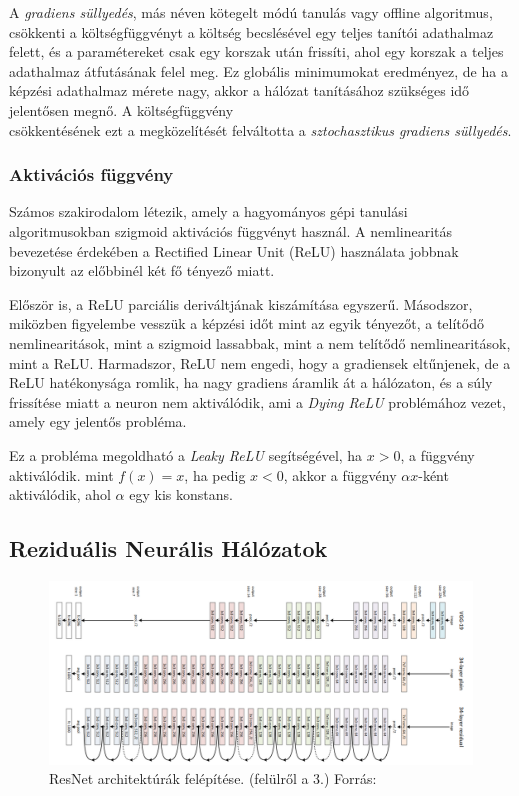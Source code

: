 \documentclass[12pt,a4]{article}
\begin{document}
	
	A \textit{gradiens süllyedés}, más néven kötegelt módú tanulás vagy offline algoritmus, csökkenti a költségfüggvényt a költség becslésével egy teljes tanítói adathalmaz felett, és a paramétereket csak egy korszak után frissíti, ahol egy korszak a teljes adathalmaz átfutásának felel meg.
	Ez globális minimumokat eredményez, de ha a képzési adathalmaz mérete nagy, akkor a hálózat tanításához szükséges idő
	jelentősen megnő. A költségfüggvény
	\\
	csökkentésének ezt a megközelítését felváltotta a \textit{sztochasztikus gradiens süllyedés}.
	\subsubsection{Aktivációs függvény}
	
	
	Számos szakirodalom létezik, amely a hagyományos gépi tanulási algoritmusokban
	szigmoid aktivációs függvényt használ.
	A nemlinearitás bevezetése érdekében a Rectified Linear Unit (ReLU) \cite{CNN} használata jobbnak bizonyult az előbbinél
	két fő tényező miatt. 
	
	Először is, a ReLU parciális deriváltjának kiszámítása egyszerű. 
	Másodszor, miközben figyelembe vesszük
	a képzési időt mint az egyik tényezőt, a telítődő nemlinearitások, mint a szigmoid lassabbak, mint a nem telítődő nemlinearitások, mint a ReLU.
	 Harmadszor, ReLU nem engedi, hogy a gradiensek eltűnjenek, de a ReLU hatékonysága romlik, ha nagy gradiens áramlik át a hálózaton, és a súly frissítése miatt a neuron nem aktiválódik, ami a \textit{Dying ReLU} problémához vezet, amely egy jelentős probléma. 
	 
	 Ez a probléma megoldható a \textit{Leaky ReLU} segítségével, ha $x>0$, a függvény aktiválódik.
	mint $f(x)= x$, ha pedig $x<0$, akkor a függvény $\alpha x$-ként aktiválódik, ahol $\alpha$ egy kis konstans.

    \subsection{Reziduális Neurális Hálózatok}
    
    \begin{figure}[h]	
 		\centering
 		\includegraphics[width=1\linewidth]{ResNet}
 		\caption{ResNet architektúrák felépítése. (felülről a 3.)
 			Forrás:\cite{resnet}}
        \label{fig:resnet}
 	\end{figure}
    
\end{document}
